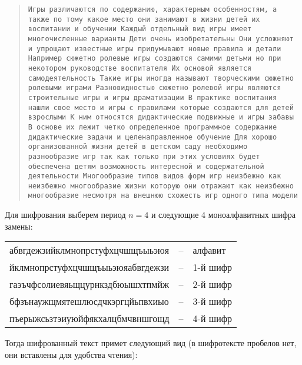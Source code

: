 \begin{quote}
    \noindent \texttt{Игры различаются по содержанию, характерным особенностям, а также по тому какое место они занимают в жизни детей их воспитании и обучении Каждый отдельный вид игры имеет многочисленные варианты Дети очень изобретательны Они усложняют и упрощают известные игры придумывают новые правила и детали Например сюжетно ролевые игры создаются самими детьми но при некотором руководстве воспитателя Их основой является самодеятельность Такие игры иногда называют творческими сюжетно ролевыми играми Разновидностью сюжетно ролевой игры являются строительные игры и игры драматизации В практике воспитания нашли свое место и игры с правилами которые создаются для детей взрослыми К ним относятся дидактические подвижные и игры забавы В основе их лежит четко определенное программное содержание дидактические задачи и целенаправленное обучение Для хорошо организованной жизни детей в детском саду необходимо разнообразие игр так как только при этих условиях будет обеспечена детям возможность интересной и содержательной деятельности Многообразие типов видов форм игр неизбежно как неизбежно многообразие жизни которую они отражают как неизбежно многообразие несмотря на внешнюю схожесть игр одного типа модели}
\end{quote}

Для шифрования выберем период $n=4$ и следующие 4 моноалфавитных шифра замены:

\begin{center} \begin{tabular}{|lcl|}
    \hline
    абвгдежзийклмнопрстуфхцчшщъыьэюя & -- & алфавит \\
    йклмнопрстуфхцчшщъыьэюяабвгдежзи & -- & 1-й шифр \\
    гаэъчфсолиевяьщцурнкздбюышхтпмйж & -- & 2-й шифр \\
    бфзънаужщмятешлюсдчкэргцйьпвхиыо & -- & 3-й шифр \\
    пъерыжсьзтэиуюйфякхалцбмчвншгощд & -- & 4-й шифр \\
    \hline
\end{tabular} \end{center}

Тогда шифрованный текст примет следующий вид (в шифротексте пробелов нет, они вставлены для удобства чтения):


